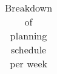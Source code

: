 \begin{table}[H]
\begin{center}
\begin{tabular}{|c|c|p{8cm}|}
      \hline
    \end{tabular}
  \end{center}
  \caption{Breakdown of planning schedule per week}
    \label{tab:tablea1}
\end{table}
